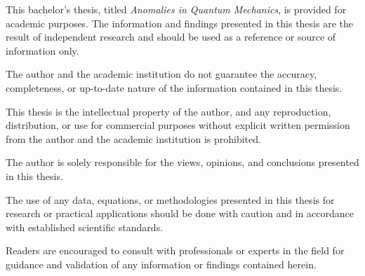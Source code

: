 \noindent
This bachelor's thesis, titled \textit{Anomalies in Quantum Mechanics}, is provided for academic purposes. The information and findings presented in this thesis are the result of independent research and should be used as a reference or source of information only.

The author and the academic institution do not guarantee the accuracy, completeness, or up-to-date nature of the information contained in this thesis. 

This thesis is the intellectual property of the author, and any reproduction, distribution, or use for commercial purposes without explicit written permission from the author and the academic institution is prohibited.

The author is solely responsible for the views, opinions, and conclusions presented in this thesis.

The use of any data, equations, or methodologies presented in this thesis for research or practical applications should be done with caution and in accordance with established scientific standards.

Readers are encouraged to consult with professionals or experts in the field for guidance and validation of any information or findings contained herein.